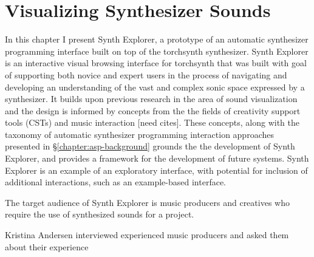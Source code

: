 \graphicspath{{./}{./figures/}{./figures/synthexplore/}}




\chapter{Visualizing Synthesizer Sounds}
\label{ch:visualization}
In this chapter I present Synth Explorer, a prototype of an automatic synthesizer programming interface built on top of the torchsynth synthesizer. Synth Explorer is an interactive visual browsing interface for torchsynth that was built with goal of supporting both novice and expert users in the process of navigating and developing an understanding of the vast and complex sonic space expressed by a synthesizer. It builds upon previous research in the area of sound visualization and the design is informed by concepts from the the fields of creativity support tools (CSTs) and music interaction [need cites]. These concepts, along with the taxonomy of automatic synthesizer programming interaction approaches presented in \S\ref{chapter:asp-background} grounds the the development of Synth Explorer, and provides a framework for the development of future systems. Synth Explorer is an example of an exploratory interface, with potential for inclusion of additional interactions, such as an example-based interface.

The target audience of Synth Explorer is music producers and creatives who require the use of synthesized sounds for a project. 

Kristina Andersen interviewed experienced music producers and asked them about their experience 




